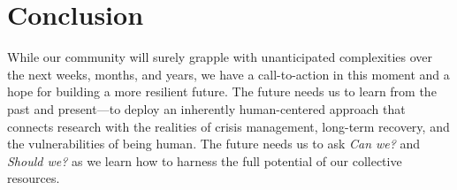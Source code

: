 \section{Conclusion}While our community will surely grapple with unanticipated complexities over the next weeks, months, and years, we have a call-to-action in this moment and a hope for building a more resilient future. The future needs us to learn from the past and present—to deploy an inherently human-centered approach that connects research with the realities of crisis management, long-term recovery, and the vulnerabilities of being human. The future needs us to ask \emph{Can we?} and \emph{Should we?} as we learn how to harness the full potential of our collective resources. 